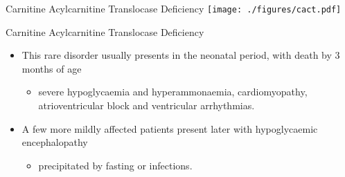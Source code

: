 \documentclass[presentation, smaller]{beamer}
\begin{document}
\begin{frame}[label={sec:orgheadline8}]{Carnitine Acylcarnitine Translocase Deficiency}
\texttt{[image: ./figures/cact.pdf]}
\end{frame}
\begin{frame}[label={sec:orgheadline9}]{Carnitine Acylcarnitine Translocase Deficiency}
\begin{itemize}
\item This rare disorder usually presents in the neonatal period, with
death by 3 months of age
\begin{itemize}
\item severe hypoglycaemia and hyperammonaemia, cardiomyopathy,
atrioventricular block and ventricular arrhythmias.
\end{itemize}
\item A few more mildly affected patients present later with hypoglycaemic
encephalopathy
\begin{itemize}
\item precipitated by fasting or infections.
\end{itemize}
\end{itemize}
\end{frame}
\end{document}
